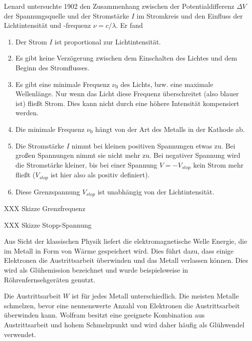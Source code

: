 Lenard untersuchte 1902 den Zusammenhang zwischen der Potentialdifferenz $\Delta V$ der Spannungsquelle und der Stromstärke $I$ im Stromkreis und den Einfluss der Lichtintensität und -frequenz $\nu = c / \lambda$. Er fand
\begin{enumerate}\setlength{\itemsep}{0pt}
    \item Der Strom $I$ ist proportional zur Lichtintensität.
    \item Es gibt keine Verzögerung zwischen dem Einschalten des Lichtes und dem Beginn des Stromflusses.
    \item Es gibt eine minimale Frequenz $\nu_0$ des Lichts, bzw. eine maximale Wellenlänge. Nur wenn das Licht diese Frequenz überschreitet (also blauer ist) fließt Strom. Dies kann nicht durch eine höhere Intensität kompensiert werden.
    \item Die minimale Frequenz $\nu_0$ hängt von der Art des Metalls in der Kathode ab.
    \item Die Stromstärke $I$ nimmt bei kleinen positiven Spannungen etwas zu. Bei großen Spannungen nimmt sie nicht mehr zu. Bei negativer Spannung wird die Stromstärke kleiner, bis bei einer Spannung $V = -V_{stop}$ kein Strom mehr fließt ($V_{stop}$ ist hier also als positiv definiert). 
    \item Diese Grenzspannung $V_{stop}$ ist unabhängig von der Lichtintensität. 
\end{enumerate}

\begin{marginfigure}
    \caption{XXX Skizze Grenzfrequenz}
   \end{marginfigure}

   \begin{marginfigure}
    \caption{XXX Skizze Stopp-Spannung}
   \end{marginfigure}


Aus Sicht der klassischen Physik liefert die elektromagnetische Welle Energie, die im Metall in Form von Wärme gespeichert wird. Dies führt dazu, dass einige Elektronen die Austrittsarbeit überwinden und das Metall verlassen können. Dies wird als Glühemission bezeichnet und wurde beispielsweise in Röhrenfernsehgeräten genutzt.

Die Austrittsarbeit $W$ ist für jedes Metall unterschiedlich. Die meisten Metalle schmelzen, bevor eine nennenswerte Anzahl von Elektronen die Austrittsarbeit überwinden kann. Wolfram besitzt eine geeignete Kombination aus Austrittsarbeit und hohem Schmelzpunkt und wird daher häufig als Glühwendel verwendet.

